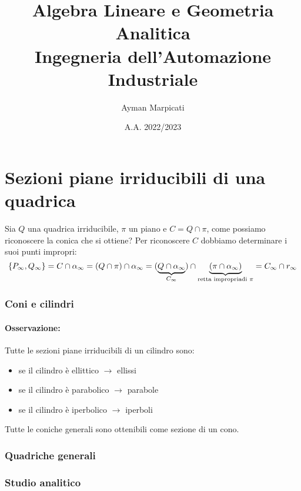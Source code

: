 \documentclass{report}
\title{\Huge{Algebra Lineare e Geometria Analitica}\\Ingegneria dell'Automazione Industriale}
\author{\huge{Ayman Marpicati}}
\date{A.A. 2022/2023}
\begin{document}
\maketitle
\newpage%
\tableofcontents


\section{Sezioni piane irriducibili di una quadrica}
Sia \(Q\) una quadrica irriducibile, \(\pi \) un piano e \(C = Q \cap \pi\), come possiamo riconoscere la conica che si ottiene? Per riconoscere \(C\) dobbiamo determinare i suoi punti impropri: \[
\{P_\infty, Q_\infty\} = C \cap \alpha _\infty = (Q \cap \pi ) \cap \alpha _\infty = (\underbrace{Q\cap \alpha _\infty}_{C_\infty} ) \cap \underbrace{(\pi \cap \alpha _\infty)}_{\text{retta impropria \\ di } \pi } = C_\infty \cap r_\infty
\]
\subsubsection{Coni e cilindri}
\paragraph{Osservazione:} Tutte le sezioni piane irriducibili di un cilindro sono:
\begin{itemize}
    \item se il cilindro è ellittico \(\to \) ellissi
    \item se il cilindro è parabolico \(\to \) parabole
    \item se il cilindro è iperbolico \(\to \) iperboli
\end{itemize}
Tutte le coniche generali sono ottenibili come sezione di un cono.

\subsubsection{Quadriche generali}

\subsubsection{Studio analitico}
\end{document}
